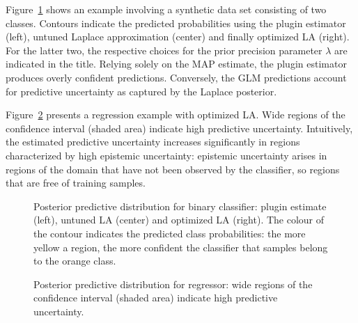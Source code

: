 \documentclass{juliacon}
\begin{document}
Figure~\ref{fig-class} shows an example involving a synthetic data set
consisting of two classes. Contours indicate the predicted probabilities
using the plugin estimator (left), untuned Laplace approximation
(center) and finally optimized LA (right). For the latter two, the
respective choices for the prior precision parameter \(\lambda\) are
indicated in the title. Relying solely on the MAP estimate, the plugin
estimator produces overly confident predictions. Conversely, the GLM
predictions account for predictive uncertainty as captured by the
Laplace posterior.

Figure~\ref{fig-reg} presents a regression example with optimized LA.
Wide regions of the confidence interval (shaded area) indicate high
predictive uncertainty. Intuitively, the estimated predictive
uncertainty increases significantly in regions characterized by high
epistemic uncertainty: epistemic uncertainty arises in regions of the
domain that have not been observed by the classifier, so regions that
are free of training samples.

\begin{figure}


\caption{\label{fig-class}Posterior predictive distribution for binary
classifier: plugin estimate (left), untuned LA (center) and optimized LA
(right). The colour of the contour indicates the predicted class
probabilities: the more yellow a region, the more confident the
classifier that samples belong to the orange class.}

\end{figure}%

\begin{figure}


\caption{\label{fig-reg}Posterior predictive distribution for regressor:
wide regions of the confidence interval (shaded area) indicate high
predictive uncertainty.}

\end{figure}%
\end{document}
